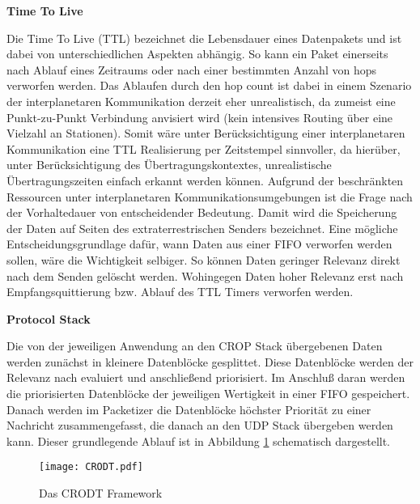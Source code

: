 \label{sec:Vorueberlegung}

\textbf{Time To Live}

Die Time To Live (TTL) bezeichnet die Lebensdauer eines Datenpakets und ist
dabei von unterschiedlichen Aspekten abh{\"a}ngig. So kann ein Paket einerseits nach
Ablauf eines Zeitraums oder nach einer bestimmten Anzahl
von hops verworfen werden. Das Ablaufen durch den hop  count ist dabei in einem Szenario der interplanetaren Kommunikation derzeit
eher unrealistisch, da zumeist eine Punkt-zu-Punkt Verbindung anvisiert
wird (kein intensives Routing {\"u}ber eine Vielzahl an Stationen). Somit
w{\"a}re unter Ber{\"u}cksichtigung einer interplanetaren Kommunikation eine TTL
Realisierung per Zeitstempel sinnvoller, da hier{\"u}ber, unter
Ber{\"u}cksichtigung des {\"U}bertragungskontextes, unrealistische
{\"U}bertragungszeiten einfach erkannt werden k{\"o}nnen.
Aufgrund der beschr{\"a}nkten Ressourcen unter interplanetaren
Kommunikationsumgebungen ist die Frage nach der Vorhaltedauer von
entscheidender Bedeutung. Damit wird die Speicherung der
Daten auf Seiten des extraterrestrischen Senders bezeichnet. 
Eine m{\"o}gliche Entscheidungsgrundlage daf{\"u}r, wann Daten aus einer
FIFO verworfen werden sollen, w{\"a}re die Wichtigkeit selbiger. So
k{\"o}nnen Daten geringer Relevanz direkt nach dem Senden gel{\"o}scht werden.
Wohingegen Daten hoher Relevanz erst nach Empfangsquittierung bzw. Ablauf des
TTL Timers verworfen werden.

\textbf{Protocol Stack} \label{sec:Konzept_Protocolstack}

Die von der jeweiligen Anwendung an den CROP Stack {\"u}bergebenen Daten werden
zun{\"a}chst in kleinere Datenbl{\"o}cke gesplittet. Diese Datenbl{\"o}cke
werden der Relevanz nach evaluiert und anschlie{\ss}end priorisiert.
Im Anschlu{\ss} daran werden die priorisierten Datenbl{\"o}cke der jeweiligen
Wertigkeit in einer FIFO gespeichert. Danach werden im
Packetizer die Datenbl{\"o}cke h{\"o}chster Priorit{\"a}t zu einer
Nachricht zusammengefasst, die danach an den UDP Stack {\"u}bergeben werden
kann. Dieser grundlegende Ablauf ist in Abbildung \ref{fig:CRODT}
 schematisch dargestellt.

\begin{figure}[H]
\centering
\texttt{[image: CRODT.pdf]}
\caption{Das CRODT Framework}
\label{fig:CRODT}
\end{figure}

